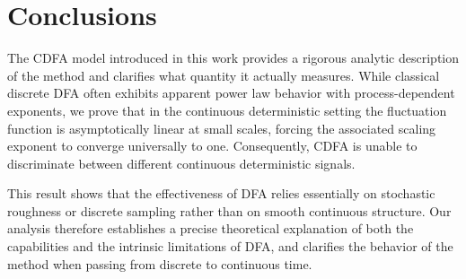 \documentclass{amsart}
\begin{document}
\section{Conclusions}
 The  CDFA model introduced in this work provides a rigorous analytic description of the method and clarifies what quantity it actually measures. While classical discrete DFA often exhibits apparent power law behavior with process-dependent exponents, we prove that in the continuous deterministic setting the fluctuation function is asymptotically linear at small scales, forcing the associated scaling exponent to converge universally to one. Consequently, CDFA is unable to discriminate between different continuous deterministic signals.

This result shows that the effectiveness of DFA relies essentially on stochastic roughness or discrete sampling rather than on smooth continuous structure. Our analysis therefore establishes a precise theoretical explanation of both the capabilities and the intrinsic limitations of DFA, and clarifies the behavior of the method when passing from discrete to continuous time.


 










\end{document}

